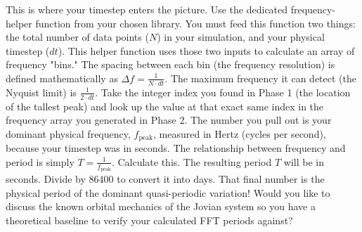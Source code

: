 \markdownRendererOlEnd \markdownRendererInterblockSeparator
{}
\markdownRendererSectionEnd \markdownRendererSectionBegin
{}\markdownRendererInterblockSeparator
{}This is where your timestep enters the picture.\markdownRendererInterblockSeparator
{}\markdownRendererOlBegin
{} Use the dedicated frequency-helper function from your chosen library. You must feed this function two things: the total number of data points ($N$) in your simulation, and your physical timestep ($dt$).\markdownRendererOlItemEnd 
{} This helper function uses those two inputs to calculate an array of frequency "bins." The spacing between each bin (the frequency resolution) is defined mathematically as $\Delta f = \frac{1}{N \cdot dt}$. The maximum frequency it can detect (the Nyquist limit) is $\frac{1}{2 \cdot dt}$.\markdownRendererOlItemEnd 
\markdownRendererOlEnd \markdownRendererInterblockSeparator
{}
\markdownRendererSectionEnd \markdownRendererSectionBegin
{}\markdownRendererInterblockSeparator
{}\markdownRendererOlBegin
{} Take the integer index you found in Phase 1 (the location of the tallest peak) and look up the value at that exact same index in the frequency array you generated in Phase 2.\markdownRendererOlItemEnd 
{} The number you pull out is your dominant physical frequency, $f_{\text{peak}}$, measured in Hertz (cycles per second), because your timestep was in seconds.\markdownRendererOlItemEnd 
{} The relationship between frequency and period is simply $T = \frac{1}{f_{\text{peak}}}$. Calculate this.\markdownRendererOlItemEnd 
{} The resulting period $T$ will be in seconds. Divide by 86400 to convert it into days.\markdownRendererOlItemEnd 
\markdownRendererOlEnd \markdownRendererInterblockSeparator
{}That final number is the physical period of the dominant quasi-periodic variation!\markdownRendererInterblockSeparator
{}Would you like to discuss the known orbital mechanics of the Jovian system so you have a theoretical baseline to verify your calculated FFT periods against?\markdownRendererInterblockSeparator
